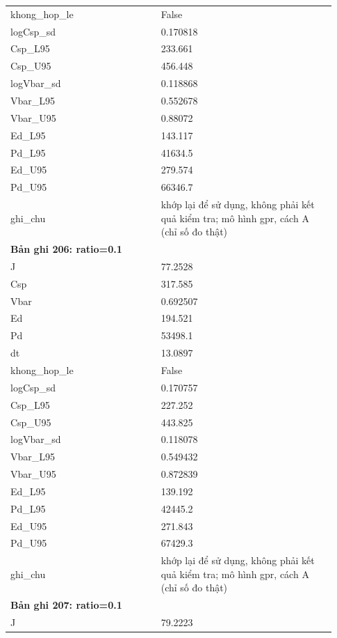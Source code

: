 \begin{longtable}{p{0.43\linewidth}p{0.50\linewidth}}
khong\_\allowbreak hop\_\allowbreak le & False \\
logCsp\_\allowbreak sd & 0.170818 \\
Csp\_\allowbreak L95 & 233.661 \\
Csp\_\allowbreak U95 & 456.448 \\
logVbar\_\allowbreak sd & 0.118868 \\
Vbar\_\allowbreak L95 & 0.552678 \\
Vbar\_\allowbreak U95 & 0.88072 \\
Ed\_\allowbreak L95 & 143.117 \\
Pd\_\allowbreak L95 & 41634.5 \\
Ed\_\allowbreak U95 & 279.574 \\
Pd\_\allowbreak U95 & 66346.7 \\
ghi\_\allowbreak chu & khớp lại để sử dụng, không phải kết quả kiểm tra; mô hình gpr, cách A (chỉ số đo thật) \\
\midrule
\multicolumn{2}{p{0.95\linewidth}}{\textbf{Bản ghi 206: ratio=0.1}} \\
J & 77.2528 \\
Csp & 317.585 \\
Vbar & 0.692507 \\
Ed & 194.521 \\
Pd & 53498.1 \\
dt & 13.0897 \\
khong\_\allowbreak hop\_\allowbreak le & False \\
logCsp\_\allowbreak sd & 0.170757 \\
Csp\_\allowbreak L95 & 227.252 \\
Csp\_\allowbreak U95 & 443.825 \\
logVbar\_\allowbreak sd & 0.118078 \\
Vbar\_\allowbreak L95 & 0.549432 \\
Vbar\_\allowbreak U95 & 0.872839 \\
Ed\_\allowbreak L95 & 139.192 \\
Pd\_\allowbreak L95 & 42445.2 \\
Ed\_\allowbreak U95 & 271.843 \\
Pd\_\allowbreak U95 & 67429.3 \\
ghi\_\allowbreak chu & khớp lại để sử dụng, không phải kết quả kiểm tra; mô hình gpr, cách A (chỉ số đo thật) \\
\midrule
\multicolumn{2}{p{0.95\linewidth}}{\textbf{Bản ghi 207: ratio=0.1}} \\
J & 79.2223 \\

\end{longtable}
